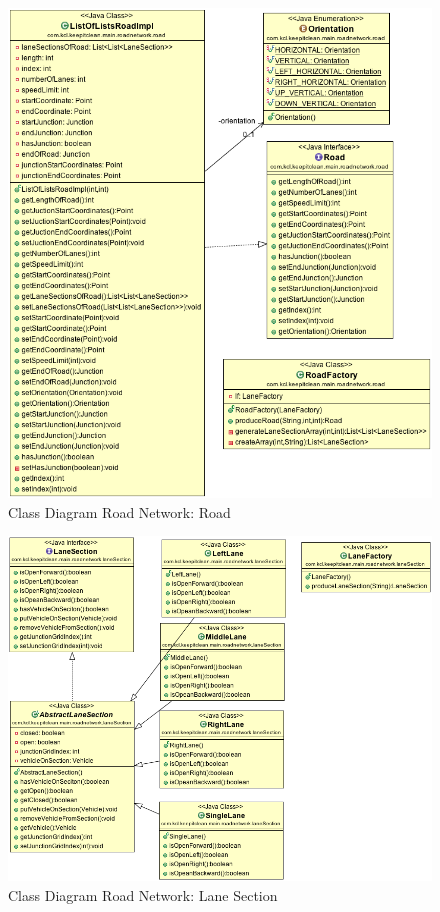 \documentclass[11pt]{article}
\begin{document}
\begin{enumerate}
\begin{figure}[H]
        \includegraphics[width=12cm]{road} 
        \centering
        \caption{Class Diagram Road Network: Road} 
        \label{cdroad}
\end{figure}

\begin{figure}[H]
        \includegraphics[width=12cm]{laneSection} 
        \centering
        \caption{Class Diagram Road Network: Lane Section} 
        \label{cdlane}
\end{figure}


\end{enumerate}
\end{document}
